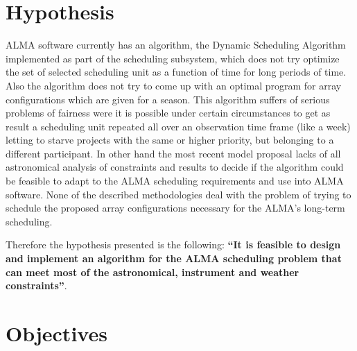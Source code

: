 \section{Hypothesis}

ALMA software currently has an algorithm, the Dynamic Scheduling Algorithm implemented as
part of the scheduling subsystem, which does not try optimize the set of selected scheduling unit
as a function of time for long periods of time. Also the algorithm does not try to come up with an
optimal program for array configurations which are given for a season. This algorithm suffers of
serious problems of fairness were it is possible under certain circumstances to get as result a
scheduling unit repeated all over an observation time frame (like a week) letting to starve
projects with the same or higher priority, but belonging to a different participant.
In other hand the most recent model proposal lacks of all astronomical analysis of constraints and
results to decide if the algorithm could be feasible to adapt to the ALMA scheduling requirements
and use into ALMA software.
None of the described methodologies deal with the problem of trying to schedule the proposed
array configurations necessary for the ALMA’s long-term scheduling.

Therefore the hypothesis presented is the following: \textbf{``It is feasible to design and implement an algorithm for the ALMA scheduling problem that can meet most of the astronomical, instrument and weather constraints''}.

\section{Objectives}


